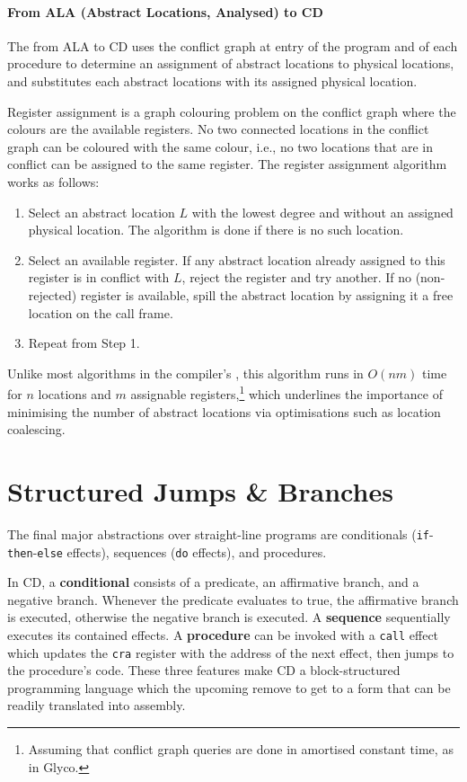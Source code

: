 \documentclass[main.tex]{subfiles}
\begin{document}
\paragraph{From ALA (Abstract Locations, Analysed) to CD} The  from ALA to CD uses the conflict graph at entry of the program and of each procedure to determine an assignment of abstract locations to physical locations, and substitutes each abstract locations with its assigned physical location.

Register assignment is a graph colouring problem on the conflict graph where the colours are the available registers. No two connected locations in the conflict graph can be coloured with the same colour, i.e., no two locations that are in conflict can be assigned to the same register. The register assignment algorithm works as follows:
\begin{enumerate}
	\item Select an abstract location $L$ with the lowest degree and without an assigned physical location. The algorithm is done if there is no such location.
	\item Select an available register. If any abstract location already assigned to this register is in conflict with $L$, reject the register and try another. If no (non-rejected) register is available, spill the abstract location by assigning it a free location on the call frame.
	\item Repeat from Step 1.
\end{enumerate}

Unlike most algorithms in the compiler's , this algorithm runs in $O(nm)$ time for $n$ locations and $m$ assignable registers,\footnote{Assuming that conflict graph queries are done in amortised constant time, as in Glyco.} which underlines the importance of minimising the number of abstract locations via optimisations such as location coalescing.

\section{Structured Jumps \& Branches} \label{sct:cd}
The final major abstractions over straight-line programs are conditionals (\texttt{if}-\texttt{then}-\texttt{else} effects), sequences (\texttt{do} effects), and procedures.

In CD, a \textbf{conditional} consists of a predicate, an affirmative branch, and a negative branch. Whenever the predicate evaluates to true, the affirmative branch is executed, otherwise the negative branch is executed. A \textbf{sequence} sequentially executes its contained effects. A \textbf{procedure} can be invoked with a \texttt{call} effect which updates the \texttt{cra} register with the address of the next effect, then jumps to the procedure's code. These three features make CD a block-structured programming language which the upcoming  remove to get to a form that can be readily translated into assembly.
\end{document}
